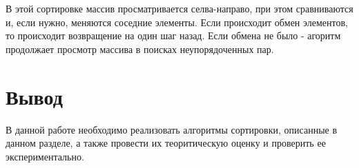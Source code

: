 В этой сортировке массив просматривается селва-направо, при этом сравниваются и, если нужно, меняются соседние элементы. Если происходит обмен элементов, то происходит возвращение на один шаг назад. Если обмена не было - агоритм продолжает просмотр массива в поисках неупорядоченных пар.

\section*{Вывод}
В данной работе необходимо реализовать алгоритмы сортировки, описанные в данном разделе, а также провести их теоритическую оценку и проверить ее экспериментально.